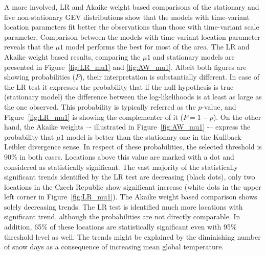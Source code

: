 A more involved, LR and Akaike weight based comparisons of the stationary and five non-stationary GEV distributions show that the models with time-variant location parameters fit better the observations than those with time-variant scale parameter. Comparison between the models with time-variant location parameter reveals that the $\mu 1$ model performs the best for most of the area. The LR and Akaike weight based results, comparing the $\mu 1$ and stationary models are presented in Figure~\ref{fig:LR_mu1} and \ref{fig:AW_mu1}. Albeit both figures are showing probabilities ($P$), their interpretation is substantially different. In case of the LR test it expresses the probability that if the null hypothesis is true (stationary model) the difference between the log-likelihoods is at least as large as the one observed. This probability is typically referred as the $p$-value, and Figure~\ref{fig:LR_mu1} is showing the complementer of it ($P = 1 - p$). On the other hand, the Akaike weights –- illustrated in Figure~\ref{fig:AW_mu1} -– express the probability that $\mu 1$ model is better than the stationary one in the Kullback-Leibler divergence sense. In respect of these probabilities, the selected threshold is 90\% in both cases. Locations above this value are marked with a dot and considered as statistically significant. The vast majority of the statistically significant trends identified by the LR test are decreasing (black dots), only two locations in the Czech Republic show significant increase (white dots in the upper left corner in Figure~\ref{fig:LR_mu1}). The Akaike weight based comparison shows solely decreasing trends. The LR test is identified much more locations with significant trend, although the probabilities are not directly comparable. In addition, 65\% of these locations are statistically significant even with 95\% threshold level as well. The trends might be explained by the diminishing number of snow days as a consequence of increasing mean global temperature.

